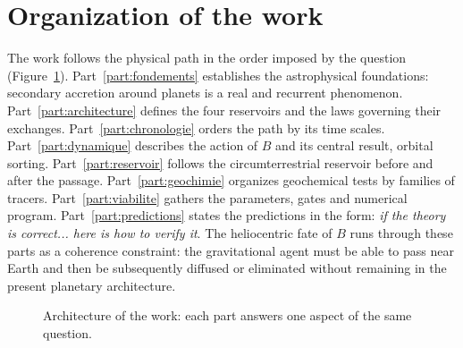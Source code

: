 \documentclass[11pt,a4paper,openany]{report}
\newcommand{\RD}{\mathcal{R}_{D}}
\begin{document}
\section{Organization of the work}

The work follows the physical path in the order imposed by the question (Figure~\ref{fig:plan}).
Part~\ref{part:fondements} establishes the astrophysical foundations: secondary accretion around
planets is a real and recurrent phenomenon. Part~\ref{part:architecture} defines the four
reservoirs and the laws governing their exchanges. Part~\ref{part:chronologie} orders the path by
its time scales. Part~\ref{part:dynamique} describes the action of $B$ and its central result,
orbital sorting. Part~\ref{part:reservoir} follows the circumterrestrial reservoir before and after
the passage. Part~\ref{part:geochimie} organizes geochemical tests by families of tracers.
Part~\ref{part:viabilite} gathers the parameters, gates and numerical program. Part~\ref{part:predictions}
states the predictions in the form: \emph{if the theory is correct... here is how to verify it}.
The heliocentric fate of $B$ runs through these parts as a coherence constraint: the gravitational
agent must be able to pass near Earth and then be subsequently diffused or eliminated without
remaining in the present planetary architecture.

\begin{figure}[htbp]
\centering
{}
\caption{Architecture of the work: each part answers one aspect of the same question.}
\label{fig:plan}
\end{figure}
\end{document}
